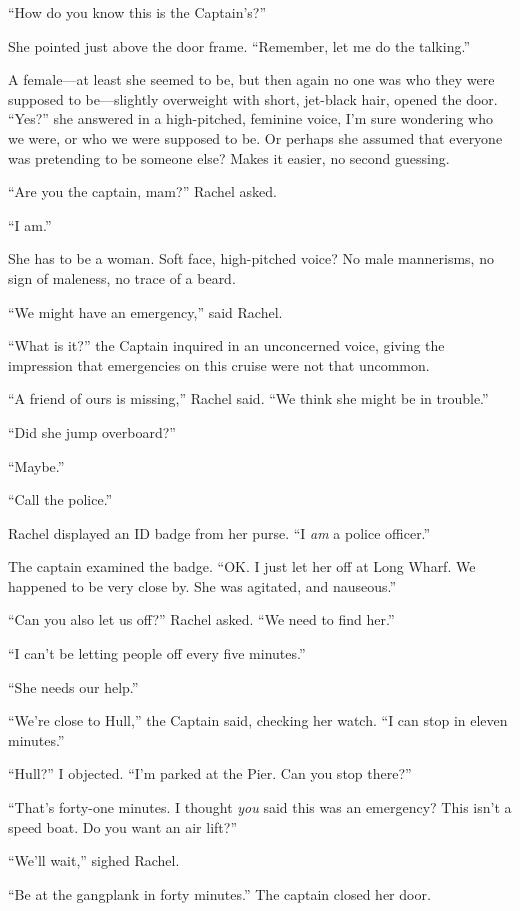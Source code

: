 ``How do you know this is the Captain's?''

She pointed just above the door frame. ``Remember, let me do the
talking.''

A female---at least she seemed to be, but then again no one was who they
were supposed to be---slightly overweight with short, jet-black hair,
opened the door. ``Yes?'' she answered in a high-pitched, feminine
voice, I'm sure wondering who we were, or who we were supposed to be. Or
perhaps she assumed that everyone was pretending to be someone else?
Makes it easier, no second guessing.

``Are you the captain, mam?'' Rachel asked.

``I am.''

She has to be a woman. Soft face, high-pitched voice? No male
mannerisms, no sign of maleness, no trace of a beard.

``We might have an emergency,'' said Rachel.

``What is it?'' the Captain inquired in an unconcerned voice, giving the
impression that emergencies on this cruise were not that uncommon.

``A friend of ours is missing,'' Rachel said. ``We think she might be in
trouble.''

``Did she jump overboard?''

``Maybe.''

``Call the police.''

Rachel displayed an ID badge from her purse. ``I \emph{am} a police
officer.''

The captain examined the badge. ``OK. I just let her off at Long Wharf.
We happened to be very close by. She was agitated, and nauseous.''

``Can you also let us off?'' Rachel asked. ``We need to find her.''

``I can't be letting people off every five minutes.''

``She needs our help.''

``We're close to Hull,'' the Captain said, checking her watch. ``I can
stop in eleven minutes.''

``Hull?'' I objected. ``I'm parked at the Pier. Can you stop there?''

``That's forty-one minutes. I thought \emph{you} said this was an
emergency? This isn't a speed boat. Do you want an air lift?''

``We'll wait,'' sighed Rachel.

``Be at the gangplank in forty minutes.'' The captain closed her door.

